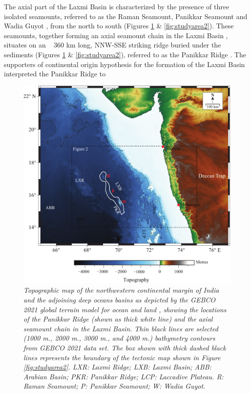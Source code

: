\documentclass[twocolumn]{article}
\begin{document}
The axial part of the Laxmi Basin is characterized by the presence of three isolated seamounts, referred to as the Raman Seamount, Panikkar Seamount and Wadia Guyot \citep{Bhattacharya1994b}, from the north to south (Figures \ref{fig:studyarea} \& \ref{fig:studyarea2}). These seamounts, together forming an axial seamount chain in the Laxmi Basin \citep{Bhattacharya1994b}, situates on an ~ 360 km long, NNW-SSE striking ridge buried under the sediments (Figures \ref{fig:studyarea} \& \ref{fig:studyarea2}), referred to as the Panikkar Ridge \citep{Gopala_Rao1992}. The supporters of continental origin hypothesis for the formation of the Laxmi Basin interpreted the Panikkar Ridge to\begin{figure}[!htb]
	\centering
	\includegraphics[width=0.85\linewidth]{studyarea-bathy.pdf}
	\caption{
\textsl{	Topographic map of the northwestern continental margin of India and the adjoining deep oceans basins as depicted by the GEBCO 2021 global terrain model for ocean and land \citep{GEBCO_Compilation_Group2021}, showing the locations of the Panikkar Ridge (shown as thick white line) and the axial seamount chain in the Laxmi Basin. Thin black lines are selected (1000 m., 2000 m., 3000 m., and 4000 m.) bathymetry contours from GEBCO 2021 data set. The box shown with thick dashed black lines represents the boundary of the tectonic map shown in Figure \ref{fig:studyarea2}. LXR: Laxmi Ridge; LXB: Laxmi Basin; ABB: Arabian Basin; PKR: Panikkar Ridge; LCP: Laccadive Plateau. R: Raman Seamount; P: Panikkar Seamount; W: Wadia Guyot.}
	}
	\label{fig:studyarea}

\end{figure}
\end{document}
